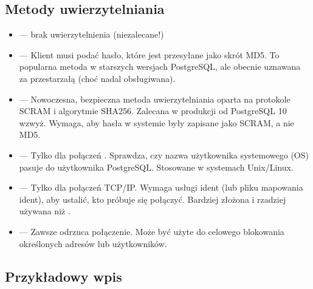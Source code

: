 \documentclass[a4paper,11pt,polish]{sphinxmanual}
\begin{document}
\subsection{Metody uwierzytelniania}
\label{\detokenize{Bezpieczenstwo/index:metody-uwierzytelniania}}\begin{itemize}
\item {} 
\sphinxAtStartPar
{} — brak uwierzytelnienia (niezalecane!)

\item {} 
\sphinxAtStartPar
{} — Klient musi podać hasło, które jest przesyłane jako skrót MD5.
To popularna metoda w starszych wersjach PostgreSQL, ale obecnie uznawana za przestarzałą (choć nadal obsługiwana).

\item {} 
\sphinxAtStartPar
{} — Nowoczesna, bezpieczna metoda uwierzytelniania oparta na protokole SCRAM i algorytmie SHA\sphinxhyphen{}256.
Zalecana w produkcji od PostgreSQL 10 wzwyż. Wymaga, aby hasła w systemie były zapisane jako SCRAM, a nie MD5.

\item {} 
\sphinxAtStartPar
{} — Tylko dla połączeń . Sprawdza, czy nazwa użytkownika systemowego (OS) pasuje do użytkownika PostgreSQL.
Stosowane w systemach Unix/Linux.

\item {} 
\sphinxAtStartPar
{} — Tylko dla połączeń TCP/IP. Wymaga usługi ident (lub pliku mapowania ident), aby ustalić, kto próbuje się połączyć.
Bardziej złożona i rzadziej używana niż .

\item {} 
\sphinxAtStartPar
{} — Zawsze odrzuca połączenie. Może być użyte do celowego blokowania określonych adresów lub użytkowników.

\end{itemize}


\subsection{Przykładowy wpis}
\label{\detokenize{Bezpieczenstwo/index:przykladowy-wpis}}
\begin{sphinxVerbatim}[commandchars=\\\{\}]
                                                
\end{sphinxVerbatim}
\end{document}
